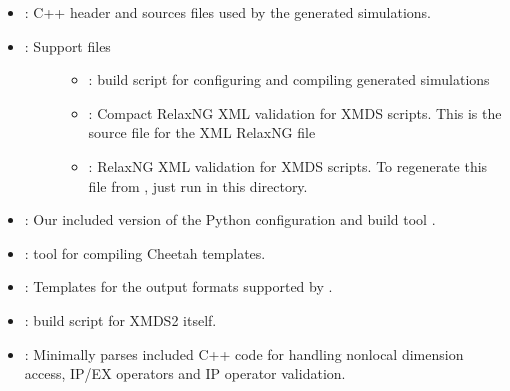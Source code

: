 \documentclass[letterpaper,10pt,english]{sphinxmanual}
\begin{document}
\begin{itemize}
\begin{description}
\begin{itemize}
\item {} 
\sphinxAtStartPar
{}: C++ header and sources files used by the generated simulations.

\item {} \begin{description}
\item[{: Support files}] \leavevmode\begin{itemize}
\item {} 
\sphinxAtStartPar
{}:  build script for configuring and compiling generated simulations

\item {} 
\sphinxAtStartPar
{}: Compact RelaxNG XML validation for XMDS scripts.  This is the source file for the XML RelaxNG file 

\item {} 
\sphinxAtStartPar
{}: RelaxNG XML validation for XMDS scripts.  To regenerate this file from , just run  in this directory.

\end{itemize}

\end{description}

\item {} 
\sphinxAtStartPar
{}: Our included version of the Python configuration and build tool .

\item {} 
\sphinxAtStartPar
{}:  tool for compiling Cheetah templates.

\item {} 
\sphinxAtStartPar
{}: Templates for the output formats supported by .

\item {} 
\sphinxAtStartPar
{}:  build script for XMDS2 itself.

\item {} 
\sphinxAtStartPar
{}: Minimally parses included C++ code for handling nonlocal dimension access, IP/EX operators and IP operator validation.


\end{itemize}
\end{description}
\end{itemize}
\end{document}

